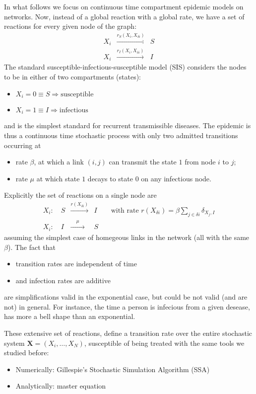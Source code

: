 In what follows we focus on continuous time compartment epidemic models on networks. Now, instead of a global reaction with a global rate, we have a set of reactions for every given node of the graph:
\begin{eqnarray*}
  X_i &\xrightarrow{r_{S}(X_i,X_{\delta i})}& S \\
  X_i &\xrightarrow{r_{I}(X_i,X_{\delta i})}& I
\end{eqnarray*}
The standard susceptible-infectious-susceptible model (SIS) considers the nodes to be in either of two compartments (states):
\begin{itemize}
 \item $X_i = 0 \equiv S \Rightarrow \mbox{susceptible}$
 \item $X_i = 1 \equiv I \Rightarrow \mbox{infectious}$ 
\end{itemize}
and is the simplest standard for recurrent transmissible diseases. The epidemic is thus a continuous time stochastic process with only two admitted transitions occurring at
\begin{itemize}
 \item rate $\beta$, at which a link $(i,j)$ can transmit the state $1$ from node $i$ to $j$;
 \item rate $\mu$ at which state $1$ decays to state $0$ on any infectious node.
\end{itemize}
Explicitly the set of reactions on a single node are
\begin{eqnarray*}
X_i:\quad  S &\xrightarrow{  r(X_{\delta i})}& I \qquad \mbox{with rate } r(X_{\delta i}) = \beta \sum_{j\in \delta i } \delta_{X_j,I} \\
X_i:\quad  I &\xrightarrow{\phantom{xx}\mu\phantom{xx}}& S
\end{eqnarray*}
assuming the simplest case of homegeous links in the network (all with the same $\beta$). The fact that 
\begin{itemize}
 \item transition rates are independent of time
 \item and infection rates are additive
\end{itemize}
are simplifications valid in the exponential case, but could be not valid (and are not) in general. For instance, the time a person is infecious from a given desease, has more a bell shape than an exponential.

These extensive set of reactions, define a transition rate over the entire stochastic system 
$\bm{X} = (X_i,\ldots,X_N)$, susceptible of being treated with the same tools we studied before:
\begin{itemize}
 \item Numerically: Gillespie's Stochastic Simulation Algorithm (SSA) 
 \item Analytically: master equation
\end{itemize}

